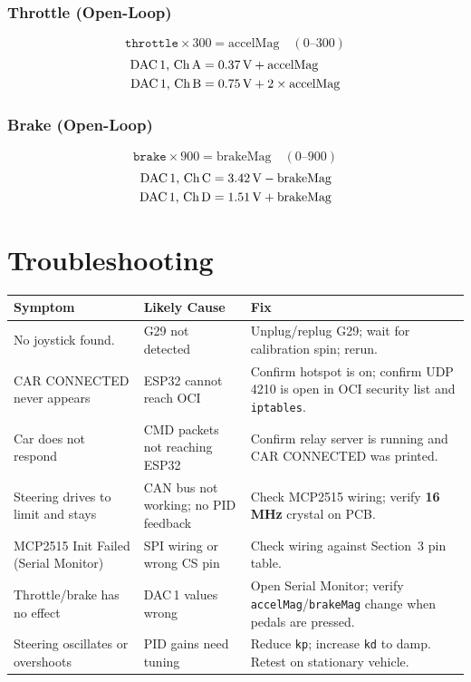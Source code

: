 ﻿\documentclass[12pt, letterpaper]{article}
\begin{document}
\subsubsection*{Throttle (Open-Loop)}

\[
  \texttt{throttle}\times 300 = \text{accelMag}\quad(0\text{--}300)
\]
\begin{align*}
  \text{DAC\,1, Ch\,A} &= 0.37\,\text{V} + \text{accelMag}\\
  \text{DAC\,1, Ch\,B} &= 0.75\,\text{V} + 2\times\text{accelMag}
\end{align*}

\subsubsection*{Brake (Open-Loop)}

\[
  \texttt{brake}\times 900 = \text{brakeMag}\quad(0\text{--}900)
\]
\begin{align*}
  \text{DAC\,1, Ch\,C} &= 3.42\,\text{V} - \text{brakeMag}\\
  \text{DAC\,1, Ch\,D} &= 1.51\,\text{V} + \text{brakeMag}
\end{align*}

\section{Troubleshooting}

\begin{longtable}{>{\ttfamily\small}p{4.2cm}p{4.5cm}p{5.5cm}}
  \toprule
  \textbf{\rmfamily Symptom} & \textbf{Likely Cause} & \textbf{Fix}\\
  \midrule\endhead\bottomrule\endfoot
  No joystick found.
    & G29 not detected
    & Unplug/replug G29; wait for calibration spin; rerun.\\[5pt]
  CAR CONNECTED never appears
    & ESP32 cannot reach OCI
    & Confirm hotspot is on; confirm UDP 4210 is open in OCI security list and \texttt{iptables}.\\[5pt]
  Car does not respond
    & CMD packets not reaching ESP32
    & Confirm relay server is running and CAR CONNECTED was printed.\\[5pt]
  Steering drives to limit and stays
    & CAN bus not working; no PID feedback
    & Check MCP2515 wiring; verify \textbf{16\,MHz} crystal on PCB.\\[5pt]
  MCP2515 Init Failed (Serial Monitor)
    & SPI wiring or wrong CS pin
    & Check wiring against Section~3 pin table.\\[5pt]
  Throttle/brake has no effect
    & DAC\,1 values wrong
    & Open Serial Monitor; verify \texttt{accelMag}/\texttt{brakeMag} change when pedals are pressed.\\[5pt]
  Steering oscillates or overshoots
    & PID gains need tuning
    & Reduce \texttt{kp}; increase \texttt{kd} to damp.  Retest on stationary vehicle.\\
\end{longtable}
\end{document}
